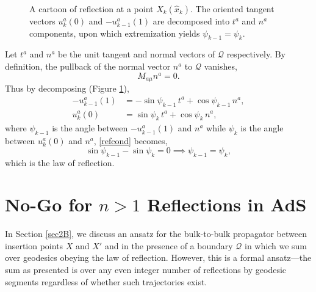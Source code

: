 \documentclass[reprint,amsmath,amssymb,aps,nofootinbib,twocolumn]{revtex4-2}
\begin{document}
\begin{appendix}
\begin{figure}
\begin{tikzpicture}[scale=1.55]
\end{tikzpicture}

\caption{A cartoon of reflection at a point $X_k(\hat{x}_k)$. The oriented tangent vectors $u_k^a(0)$ and $-u_{k-1}^a(1)$ are decomposed into $t^a$ and $n^a$ components, upon which extremization yields $\psi_{k-1} = \psi_k$.}
\label{figs:reflectProof}
\end{figure}

Let $ t^{a} $ and $ n^{a} $ be the unit tangent and normal vectors of $ \mathcal{Q} $ respectively. By definition, the pullback of the normal vector $ n^{a} $ to $ \mathcal{Q} $ vanishes,
\begin{equation}
M_{a\mu}n^{a} = 0.
\end{equation}
Thus by decomposing (Figure \ref{figs:reflectProof}),
\begin{align}
-u_{k-1}^a(1) &= -\sin\psi_{k-1}\,t^a + \cos\psi_{k-1}\,n^a,\\
u_k^a(0) &= \sin\psi_k\,t^a + \cos\psi_k\,n^a,
\end{align}
where $\psi_{k-1}$ is the angle between $-u_{k-1}^a(1)$ and $n^a$ while $\psi_k$ is the angle between $u_k^a(0)$ and $n^a$, \eqref{refcond} becomes,
\begin{equation}
\sin{\psi_{k-1}} - \sin{\psi_{k}} = 0 \implies \psi_{k-1} = \psi_k,
\end{equation}
which is the law of reflection.






\section{No-Go for $n > 1$ Reflections in AdS}\label{appC}

In Section \ref{sec2B}, we discuss an ansatz for the bulk-to-bulk propagator between insertion points $X$ and $X'$ and in the presence of a boundary $\mathcal{Q}$ in which we sum over geodesics obeying the law of reflection. However, this is a formal ansatz---the sum as presented is over any even integer number of reflections by geodesic segments regardless of whether such trajectories exist.


\end{appendix}
\end{document}
